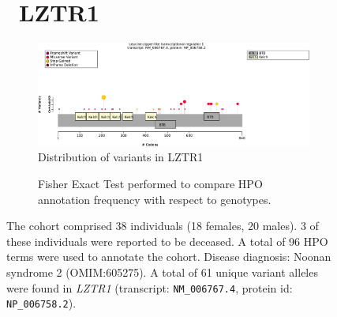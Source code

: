 \begin{figure}[htbp]
\section*{ LZTR1}
\centering
\begin{subfigure}[b]{0.95\textwidth}
\centering
\includegraphics[width=\textwidth]{ img/LZTR1_protein_diagram.pdf} 
\captionsetup{justification=raggedright,singlelinecheck=false}
\caption{Distribution of variants in LZTR1}
\end{subfigure}

\vspace{2em}

\begin{subfigure}[b]{0.95\textwidth}
\centering
{}
\captionsetup{justification=raggedright,singlelinecheck=false}
\caption{Fisher Exact Test performed to compare HPO annotation frequency with respect to genotypes.}
\end{subfigure}

\vspace{2em}

\caption{ The cohort comprised 38 individuals (18 females, 20 males). 3 of these individuals were reported to be deceased. 
A total of 96 HPO terms were used to annotate the cohort. Disease diagnosis: Noonan syndrome 2 (OMIM:605275). 
A total of 61 unique variant alleles were found in \textit{LZTR1} (transcript: \texttt{NM\_006767.4}, protein id: \texttt{NP\_006758.2}).}
\end{figure}

